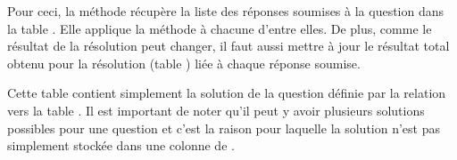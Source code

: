 \documentclass[a4paper,11pt,openany,oneside]{sphinxmanual}
\begin{document}
\begin{fulllineitems}
\begin{fulllineitems}
Pour ceci, la méthode récupère la liste des réponses soumises à la question
dans la table . Elle applique la méthode  à 
chacune d'entre elles. De plus,
comme le résultat de la résolution peut changer, il faut aussi mettre à jour
le résultat total obtenu pour la résolution (table ) liée à chaque réponse soumise.

\end{fulllineitems}


\end{fulllineitems}


\begin{fulllineitems}
\label{database:quiz.models.SqAnswer}
Cette table contient simplement la solution de la question définie par la
relation vers la table . Il est important de noter qu'il
peut y avoir plusieurs solutions possibles pour une question et c'est la raison
pour laquelle la solution n'est pas simplement stockée dans une colonne de
{\hyperref[front-end:SimpleQuestion]{\emph{}}}.

\end{fulllineitems}

\end{document}
